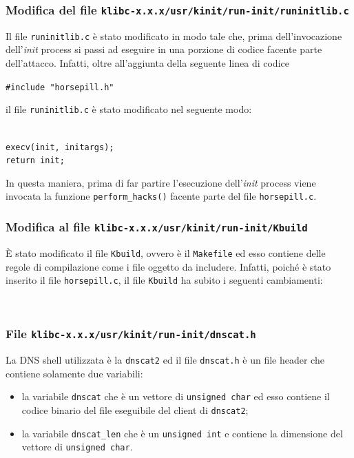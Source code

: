 \documentclass[oneside]{article}
\begin{document}
\newpage
\subsubsection{Modifica del file \texttt{klibc-x.x.x/usr/kinit/run-init/runinitlib.c}}
Il file \texttt{runinitlib.c} è stato modificato in modo tale che, prima dell'invocazione dell'\textit{init} process si passi ad eseguire in una porzione di codice facente parte dell'attacco. Infatti, oltre all'aggiunta della seguente linea di codice 
\begin{center}
\texttt{\#include "horsepill.h"}
\end{center}
il file \texttt{runinitlib.c} è stato modificato nel seguente modo:

\begin{tcolorbox}
{}\\
\texttt{execv(init, initargs);}\\
\texttt{return init;}
\end{tcolorbox}

In questa maniera, prima di far partire l'esecuzione dell'\textit{init} process viene invocata la funzione \texttt{perform\_hacks()} facente parte del file \texttt{horsepill.c}.

\subsubsection{Modifica al file \texttt{klibc-x.x.x/usr/kinit/run-init/Kbuild}}
È stato modificato il file \texttt{Kbuild}, ovvero è il \texttt{Makefile} ed esso contiene delle regole di compilazione come i file oggetto da includere. Infatti, poiché è stato inserito il file \texttt{horsepill.c}, il file \texttt{Kbuild} ha subito i seguenti cambiamenti:
\begin{tcolorbox}
{}\\
{}
\end{tcolorbox}

\subsubsection{File \texttt{klibc-x.x.x/usr/kinit/run-init/dnscat.h}}
La DNS shell utilizzata è la \texttt{dnscat2} ed il file \texttt{dnscat.h} è un file header che contiene solamente due variabili:
\begin{itemize}
\item la variabile \texttt{dnscat} che è un vettore di \texttt{unsigned char} ed esso contiene il codice binario del file eseguibile del client di \texttt{dnscat2};
\item la variabile \texttt{dnscat\_len} che è un \texttt{unsigned int} e contiene la dimensione del vettore di \texttt{unsigned char}.
\end{itemize}
\end{document}
